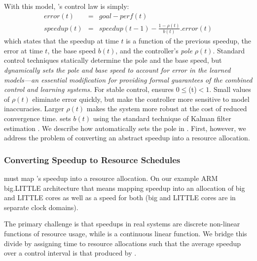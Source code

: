 With this model, \SYSTEM{}'s control law is simply:
\begin{eqnarray}
  error(t) &=& goal - perf(t) \label{eqn:speedup-error} \\
  speedup(t) &=& speedup(t-1) - \frac{1 - \rho(t)}{b(t)}.error(t)
  \label{eqn:speedup-control}
\end{eqnarray}
which states that the speedup at time $t$ is a function of the
previous speedup, the error at time $t$, the base speed $b(t)$, and
the controller's \emph{pole} $\rho(t)$.  Standard control techniques
statically determine the pole and the base speed, but \SYSTEM{}
\emph{dynamically sets the pole and base speed to account for error in
  the learned models---an essential modification for providing formal
  guarantees of the combined control and learning systems.}  For
stable control, \SYSTEM{} ensures $0 \le $\rho(t)$ < 1$. Small values
of $\rho(t)$ eliminate error quickly, but make the controller more
sensitive to model inaccuracies.  Larger $\rho(t)$ makes the system
more robust at the cost of reduced convergence time.  \SYSTEM{} sets
$b(t)$ using the standard technique of Kalman filter estimation
\cite{whelch2006kalman}. We describe how \SYSTEM{} automatically sets
the pole in .  First, however, we address the
problem of converting an abstract speedup into a resource allocation.

\subsubsection{Converting Speedup to Resource Schedules}
\SYSTEM{} must map 's speedup into a resource
allocation.  On our example ARM big.LITTLE architecture that means
mapping speedup into an allocation of big and LITTLE cores as well as
a speed for both (big and LITTLE cores are in separate clock domains).

The primary challenge is that speedups in real systems are discrete
non-linear functions of resource usage, while 
is a continuous linear function.  We bridge this divide by assigning
time to resource allocations such that the average speedup over a
control interval is that produced by .

